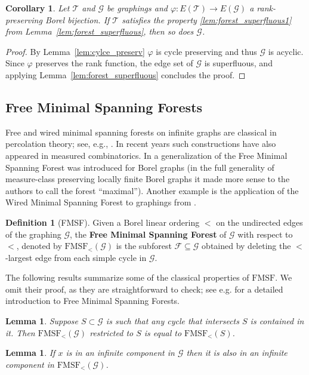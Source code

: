 \documentclass{article}
\theoremstyle{plain}
\newtheorem{lem}[thm]{Lemma}
\newtheorem{cor}[thm]{Corollary}
\theoremstyle{definition}
\newtheorem{defn}[thm]{Definition}
\newcommand{\cG}{\mathcal{G}}
\newcommand{\cF}{\mathcal{F}}
\newcommand{\cT}{\mathcal{T}}
\newcommand{\fg}{\varphi}
\begin{document}
\begin{cor}\label{cor:phi_superfluous}
    Let $\cT$ and $\cG$ be graphings and $\fg: E(\cT) \to E(\cG)$ a rank-preserving Borel bijection. If $\cT$ satisfies the property \eqref{lem:forest_superfluous1} from Lemma~\ref{lem:forest_superfluous}, then so does $\cG$.
\end{cor}
\begin{proof}
    By Lemma~\ref{lem:cylce_preserv} $\fg$ is cycle preserving and thus $\cG$ is acyclic. Since $\fg$ preserves the rank function, the edge set of $\cG$ is superfluous, and applying Lemma~\ref{lem:forest_superfluous} concludes the proof.
\end{proof}

\subsection{Free Minimal Spanning Forests}


Free and wired minimal spanning forests on infinite graphs are classical in percolation theory; see, e.g., \cite{lyons2006minimal,LyonsBook}. In recent years such constructions have also appeared in measured combinatorics. In \cite{CTT22} a generalization of the Free Minimal Spanning Forest was introduced for Borel graphs (in the full generality of measure-class preserving locally finite Borel graphs it made more sense to the authors to call the forest ``maximal''). Another example is the application of the Wired Minimal Spanning Forest to graphings from \cite{berczi2026cycle}.

\begin{defn}[FMSF]
Given a Borel linear ordering $<$ on the undirected edges of the graphing $\cG$, the \textbf{Free Minimal Spanning Forest} of $\cG$ with respect to $<$, denoted by $\mathrm{FMSF}_{<}(\cG)$ is the subforest $\cF\subseteq \cG$ obtained by deleting the $<$-largest edge from each simple cycle in $\cG$.
\end{defn}

The following results summarize some of the classical properties of $\mathrm{FMSF}$. We omit their proof, as they are straightforward to check; see e.g. \cite[Chapter 11]{LyonsBook} for a detailed introduction to Free Minimal Spanning Forests.

\begin{lem}\label{lem:FMSF_cycle_invar}
    Suppose $S\subset\cG$ is such that any cycle that intersects $S$ is contained in it. Then $\mathrm{FMSF}_{<}(\cG)$ restricted to $S$ is equal to $\mathrm{FMSF}_{<}(S)$.
\end{lem}
\begin{lem}\label{lem:FMSF_inf_sets}
    If $x$ is in an infinite component in $\cG$ then it is also in an infinite component in ${\mathrm{FMSF}_{<}(\cG)}$. 
\end{lem}
\end{document}

